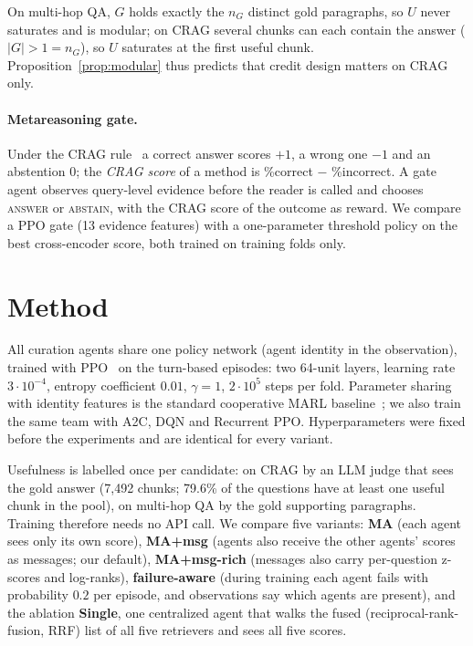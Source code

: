 \documentclass[sigconf,anonymous]{aamas}
\theoremstyle{plain}
\theoremstyle{definition}
\begin{document}
\noindent On multi-hop QA, $G$ holds exactly the $n_G$ distinct gold paragraphs, so $U$ never saturates and is modular; on CRAG several chunks can each contain the answer ($|G|>1=n_G$), so $U$ saturates at the first useful chunk. Proposition~\ref{prop:modular} thus predicts that credit design matters on CRAG only.

\paragraph{Metareasoning gate.}
Under the CRAG rule~\cite{yang2024crag} a correct answer scores $+1$, a wrong one $-1$ and an abstention $0$; the \emph{CRAG score} of a method is \%correct $-$ \%incorrect. A gate agent observes query-level evidence before the reader is called and chooses \textsc{answer} or \textsc{abstain}, with the CRAG score of the outcome as reward. We compare a PPO gate (13 evidence features) with a one-parameter threshold policy on the best cross-encoder score, both trained on training folds only.

\section{Method}

All curation agents share one policy network (agent identity in the observation), trained with PPO~\cite{schulman2017ppo} on the turn-based episodes: two 64-unit layers, learning rate $3\cdot10^{-4}$, entropy coefficient $0.01$, $\gamma=1$, $2\cdot10^{5}$ steps per fold. Parameter sharing with identity features is the standard cooperative MARL baseline~\cite{yu2022mappo}; we also train the same team with A2C, DQN and Recurrent PPO. Hyperparameters were fixed before the experiments and are identical for every variant.

Usefulness is labelled once per candidate: on CRAG by an LLM judge that sees the gold answer (7{,}492 chunks; 79.6\% of the questions have at least one useful chunk in the pool), on multi-hop QA by the gold supporting paragraphs. Training therefore needs no API call. We compare five variants: \textbf{MA} (each agent sees only its own score), \textbf{MA+msg} (agents also receive the other agents' scores as messages; our default), \textbf{MA+msg-rich} (messages also carry per-question z-scores and log-ranks), \textbf{failure-aware} (during training each agent fails with probability $0.2$ per episode, and observations say which agents are present), and the ablation \textbf{Single}, one centralized agent that walks the fused (reciprocal-rank-fusion, RRF) list of all five retrievers and sees all five scores.
\end{document}
